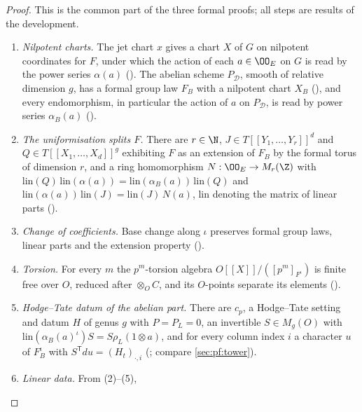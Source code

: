 \begin{proof}
This is the common part of the three formal proofs; all steps are results of the development.
\begin{enumerate}[label=(\arabic*)]
\item \emph{Nilpotent charts.} The jet chart $x$ gives a chart $X$ of $G$ on nilpotent coordinates for $F$, under
which the action of each $a\in\OO_E$ on $G$ is read by the power series $\alpha(a)$
(). The abelian scheme $P_{\mathcal D}$, smooth of
relative dimension $g$, has a formal group law $F_B$ with a nilpotent chart $X_B$
(), and every endomorphism, in particular the
action of $a$ on $P_{\mathcal D}$, is read by power series $\alpha_B(a)$
().
\item \emph{The uniformisation splits $F$.} There are $r\in\N$, $J\in T[[Y_1,\dots,Y_r]]^d$ and
$Q\in T[[X_1,\dots,X_d]]^g$ exhibiting $F$ as an extension of $F_B$ by the formal torus of dimension $r$, and a ring
homomorphism $N:\OO_E\to M_r(\Z)$ with $\mathrm{lin}(Q)\,\mathrm{lin}(\alpha(a))=\mathrm{lin}(\alpha_B(a))\,\mathrm{lin}(Q)$ and
$\mathrm{lin}(\alpha(a))\,\mathrm{lin}(J)=\mathrm{lin}(J)\,N(a)$, $\mathrm{lin}$ denoting the matrix of linear parts
().
\item \emph{Change of coefficients.} Base change along $\iota$ preserves formal group laws, linear parts and the
extension property ().
\item \emph{Torsion.} For every $m$ the $p^m$-torsion algebra $O[[X]]/([p^m]_{F^\iota})$ is finite free over $O$,
reduced after $\otimes_OC$, and its $O$-points separate its elements
().
\item \emph{Hodge--Tate datum of the abelian part.} There are $c_p$, a Hodge--Tate setting and datum $H$ of genus
$g$ with $P=P_L=0$, an invertible $S\in M_g(O)$ with $\mathrm{lin}(\alpha_B(a)^\iota)S=S\rho_L(1\otimes a)$, and for every
column index $i$ a character $u$ of $F_B^\iota$ with $S^{\mathsf T}du=(H_t)_{\cdot,i}$
(; compare \cref{sec:pf:tower}).
\item \emph{Linear data.} From (2)--(5), 

\end{enumerate}
\end{proof}
